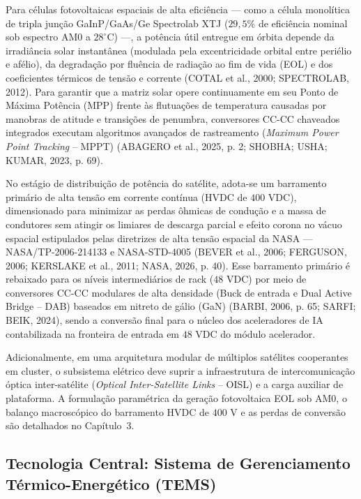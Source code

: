 Para células fotovoltaicas espaciais de alta eficiência — como a célula monolítica de tripla junção GaInP/GaAs/Ge Spectrolab XTJ ($29{,}5\%$ de eficiência nominal sob espectro AM0 a $28^\circ\text{C}$) —, a potência útil entregue em órbita depende da irradiância solar instantânea (modulada pela excentricidade orbital entre periélio e afélio), da degradação por fluência de radiação ao fim de vida (EOL) e dos coeficientes térmicos de tensão e corrente (COTAL et al., 2000; SPECTROLAB, 2012). Para garantir que a matriz solar opere continuamente em seu Ponto de Máxima Potência (MPP) frente às flutuações de temperatura causadas por manobras de atitude e transições de penumbra, conversores CC-CC chaveados integrados executam algoritmos avançados de rastreamento (\textit{Maximum Power Point Tracking} -- MPPT) (ABAGERO et al., 2025, p. 2; SHOBHA; USHA; KUMAR, 2023, p. 69).

No estágio de distribuição de potência do satélite, adota-se um barramento primário de alta tensão em corrente contínua (HVDC de $400\text{ VDC}$), dimensionado para minimizar as perdas ôhmicas de condução e a massa de condutores sem atingir os limiares de descarga parcial e efeito corona no vácuo espacial estipulados pelas diretrizes de alta tensão espacial da NASA --- NASA/TP-2006-214133 e NASA-STD-4005 (BEVER et al., 2006; FERGUSON, 2006; KERSLAKE et al., 2011; NASA, 2026, p. 40). Esse barramento primário é rebaixado para os níveis intermediários de rack ($48\text{ VDC}$) por meio de conversores CC-CC modulares de alta densidade (Buck de entrada e Dual Active Bridge -- DAB) baseados em nitreto de gálio (GaN) (BARBI, 2006, p. 65; SARFI; BEIK, 2024), sendo a conversão final para o núcleo dos aceleradores de IA contabilizada na fronteira de entrada em $48\text{ VDC}$ do módulo acelerador.

Adicionalmente, em uma arquitetura modular de múltiplos satélites cooperantes em cluster, o subsistema elétrico deve suprir a infraestrutura de intercomunicação óptica inter-satélite (\textit{Optical Inter-Satellite Links} -- OISL) e a carga auxiliar de plataforma. A formulação paramétrica da geração fotovoltaica EOL sob AM0, o balanço macroscópico do barramento HVDC de $400\text{ V}$ e as perdas de conversão são detalhados no Capítulo~3.

\subsection{Tecnologia Central: Sistema de Gerenciamento Térmico-Energético (TEMS)}

